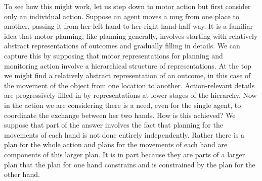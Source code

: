 \documentclass[12pt,\papersize]{extarticle}
\begin{document}


To see how this might work,
let us step down to motor action but first consider only  an individual action.
Suppose an agent moves a mug from one place to another, passing it from her left hand to her right hand half way.
It is a familiar idea that motor planning, like planning generally, involves starting with relatively abstract representations of outcomes and gradually filling in details.
We can capture this by supposing that 
motor representations for planning and monitoring action involve a hierarchical structure of representations.
At the top we might find a relatively abstract representation of an outcome, in this case of the movement of the object from one location to another.
Action-relevant details are progressively filled in by representations at lower stages of the hierarchy. 
Now in the action we are considering there is a need, even for the single agent, to coordinate the exchange between her two hands.
How is this achieved? 
We suppose that part of the answer involves the fact that planning for the movements of each hand is not done entirely independently.
Rather there is a plan for the whole action
and plans for the movements of each hand are components of this larger plan.
It is in part because they are parts of a larger plan that the plan for one hand constrains and is constrained by the plan for the other hand.
\end{document}
